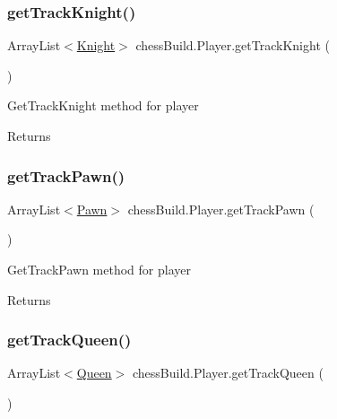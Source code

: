 \subsubsection{\texorpdfstring{get\+Track\+Knight()}{getTrackKnight()}}
{\footnotesize\ttfamily Array\+List$<$\hyperlink{classchess_build_1_1_knight}{Knight}$>$ chess\+Build.\+Player.\+get\+Track\+Knight (\begin{DoxyParamCaption}{ }\end{DoxyParamCaption})}

Get\+Track\+Knight method for player \begin{DoxyReturn}{Returns}

\end{DoxyReturn}
\mbox{\label{classchess_build_1_1_player_a031a92644a92ed146404db4332f76303}} 
\subsubsection{\texorpdfstring{get\+Track\+Pawn()}{getTrackPawn()}}
{\footnotesize\ttfamily Array\+List$<$\hyperlink{classchess_build_1_1_pawn}{Pawn}$>$ chess\+Build.\+Player.\+get\+Track\+Pawn (\begin{DoxyParamCaption}{ }\end{DoxyParamCaption})}

Get\+Track\+Pawn method for player \begin{DoxyReturn}{Returns}

\end{DoxyReturn}
\mbox{\label{classchess_build_1_1_player_aef2b846009857d7387fdcbf28b111338}} 
\subsubsection{\texorpdfstring{get\+Track\+Queen()}{getTrackQueen()}}
{\footnotesize\ttfamily Array\+List$<$\hyperlink{classchess_build_1_1_queen}{Queen}$>$ chess\+Build.\+Player.\+get\+Track\+Queen (\begin{DoxyParamCaption}{ }\end{DoxyParamCaption})}

